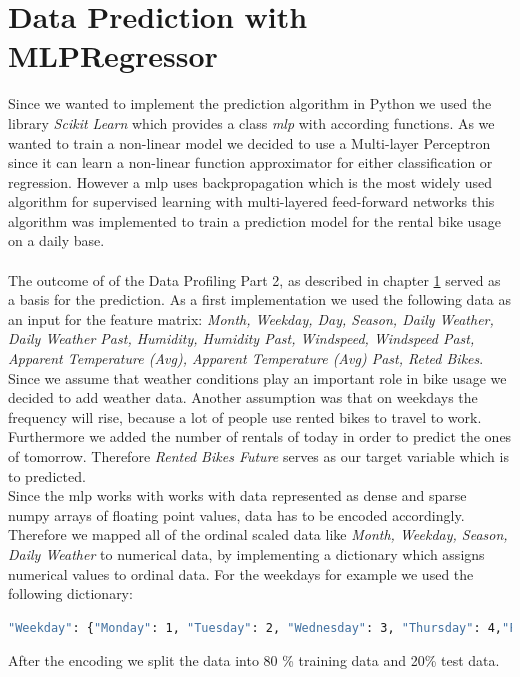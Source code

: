 
\section{Data Prediction with MLPRegressor}\label{sec:mlp}
Since we wanted to implement the prediction algorithm in Python we used the library \emph{Scikit Learn} which provides a class \emph{\acf{mlp}} with according functions.
As we wanted to train a non-linear model we decided to use a Multi-layer Perceptron since it can learn a non-linear function approximator for either classification or regression. However  a \acs{mlp} uses backpropagation which is the most widely used algorithm for supervised learning with multi-layered feed-forward networks \cite{riedmiller1993direct} this algorithm was implemented to train a prediction model for the rental bike usage on a daily base.\\\\
The outcome of of the Data Profiling Part 2, as described in chapter \ref{sec:mlp} served as a basis for the prediction.
As a first implementation we used the following data as an input for the feature matrix: \emph{Month, Weekday, Day, Season, Daily Weather, Daily Weather Past, Humidity, Humidity Past, Windspeed, Windspeed Past, Apparent Temperature (Avg), Apparent Temperature (Avg) Past, Reted Bikes}. Since we assume that weather conditions play an important role in bike usage we decided to add weather data. Another assumption was that on weekdays the frequency will rise, because a lot of people use rented bikes to travel to work. Furthermore we added the number of rentals of today in order to predict the ones of tomorrow. Therefore \emph{Rented Bikes Future} serves as our target variable which is to predicted.\\
Since the \acs{mlp} works with works with data represented as dense and sparse numpy arrays of floating point values, data has to be encoded accordingly. Therefore we mapped all of the ordinal scaled data like \emph{Month, Weekday, Season, Daily Weather} to numerical data, by implementing a dictionary which assigns numerical values to ordinal data. For the weekdays for example we used the following dictionary:
\begin{lstlisting}[language=bash,breaklines=true]
"Weekday": {"Monday": 1, "Tuesday": 2, "Wednesday": 3, "Thursday": 4,"Friday": 5, "Saturday": 6, "Sunday":7 }
\end{lstlisting}
After the encoding we split the data into 80 \% training data and 20\% test data.
